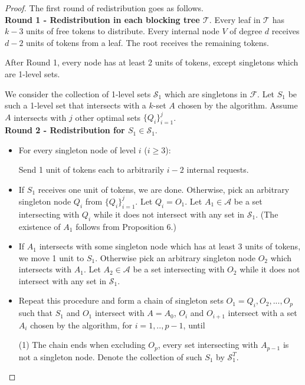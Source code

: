 \documentclass[runningheads,a4paper]{llncs}
\numberwithin{equation}{section}
\begin{document}
\begin{proof}
The first round of redistribution goes as follows. \\

\textbf{Round 1 - Redistribution in each blocking tree $\mathscr{T}$}. Every leaf in $\mathscr{T}$ has $k-3$ units of free tokens to distribute. Every internal node $V$ of degree $d$ receives $d-2$ units of tokens from a leaf. The root receives the remaining tokens.

\begin{proposition}
After Round 1, every node has at least 2 units of tokens, except singletons which are 1-level sets.
\end{proposition}

We consider the collection of 1-level sets $\mathscr{S}_1$ which are singletons in $\mathscr{F}$. Let $S_1$ be such a 1-level set that intersects with a $k$-set $A$ chosen by the algorithm. Assume $A$ intersects with $j$ other optimal sets $\{Q_i\}_{i=1}^j$. \\

\textbf{Round 2 - Redistribution for $S_1\in\mathscr{S}_1$}.
    \begin{itemize}
    \item For every singleton node of level $i$ ($i\geq 3$):

    Send 1 unit of tokens each to arbitrarily $i-2$ internal requests.
    \item If $S_1$ receives one unit of tokens, we are done. Otherwise, pick an arbitrary singleton node $Q_i$ from $\{Q_i\}_{i=1}^j$. Let $Q_i=O_1$. Let $A_1\in\mathscr{A}$ be a set intersecting with $Q_i$ while it does not intersect with any set in $\mathscr{S}_1$. (The existence of $A_1$ follows from Proposition 6.)
    \item If $A_1$ intersects with some singleton node which has at least 3 units of tokens, we move 1 unit to $S_1$. Otherwise pick an arbitrary singleton node $O_2$ which intersects with $A_1$. Let $A_2\in\mathscr{A}$ be a set intersecting with $O_2$ while it does not intersect with any set in $\mathscr{S}_1$.
    \item Repeat this procedure and form a chain of singleton sets $O_1=Q_i,O_2,...,O_p$ such that $S_1$ and $O_1$ intersect with $A=A_0$, $O_i$ and $O_{i+1}$ intersect with a set $A_i$ chosen by the algorithm, for $i=1,..,p-1$, until


        (1) The chain ends when excluding $O_p$, every set intersecting with $A_{p-1}$ is not a singleton node. Denote the collection of such $S_1$ by $\mathscr{S}_1^T$.


\end{itemize}
\end{proof}
\end{document}
